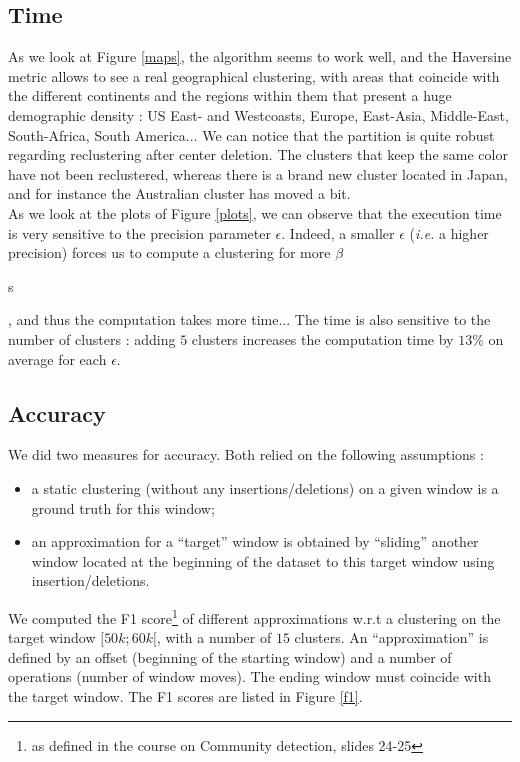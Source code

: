 \documentclass[a4paper,10pt]{article}
\begin{document}
	\subsection{Time}
		As we look at Figure \ref{maps}, the algorithm seems to work well, and the Haversine metric allows to see a real geographical clustering, with areas that coincide with the different continents and the regions within them that present a huge demographic density : US East- and Westcoasts, Europe, East-Asia, Middle-East, South-Africa, South America... We can notice that the partition is quite robust regarding reclustering after center deletion. The clusters that keep the same color have not been reclustered, whereas there is a brand new cluster located in Japan, and for instance the Australian cluster has moved a bit.\\
		As we look at the plots of Figure \ref{plots}, we can observe that the execution time is very sensitive to the precision parameter $\epsilon$. Indeed, a smaller $\epsilon$ (\textit{i.e.} a higher precision) forces us to compute a clustering for more $\beta$\begin{tiny}s\end{tiny}, and thus the computation takes more time... The time is also sensitive to the number of clusters : adding $5$ clusters increases the computation time by $13\%$ on average for each $\epsilon$.
	\subsection{Accuracy}
		We did two measures for accuracy. Both relied on the following assumptions :
		\begin{itemize}
			\item a static clustering (without any insertions/deletions) on a given window is a ground truth for this window;
			\item an approximation for a ``target'' window is obtained by ``sliding'' another window located at the beginning of the dataset to this target window using insertion/deletions.
		\end{itemize}
		We computed the F1 score\footnote{as defined in the course on Community detection, slides 24-25} of different approximations w.r.t a clustering on the target window $[50k; 60k[$, with a number of $15$ clusters. An ``approximation'' is defined by an offset (beginning of the starting window) and a number of operations (number of window moves). The ending window must coincide with the target window. The F1 scores are listed in Figure \ref{f1}.
		
\end{document}
